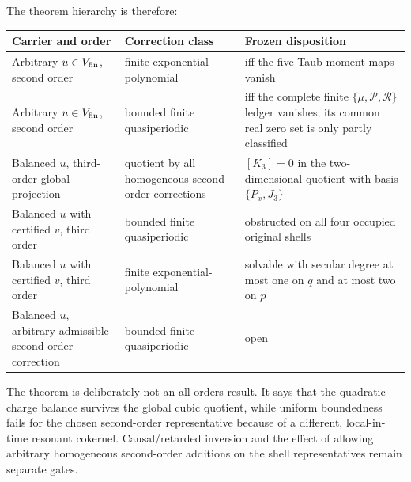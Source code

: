 \documentclass[11pt]{article}
\theoremstyle{definition}
\theoremstyle{remark}
\newcommand{\cP}{\mathcal P}
\newcommand{\cR}{\mathcal R}
\begin{document}
The theorem hierarchy is therefore:
\begin{center}
\small
\begin{tabularx}{0.98\textwidth}{@{}Y Y Y@{}}
\toprule
Carrier and order & Correction class & Frozen disposition\\
\midrule
Arbitrary $u\in V_{\rm fin}$, second order & finite
exponential-polynomial & iff the five Taub moment maps vanish\\
Arbitrary $u\in V_{\rm fin}$, second order & bounded finite
quasiperiodic & iff the complete finite $\{\mu,\cP,\cR\}$ ledger
vanishes; its common real zero set is only partly classified\\
Balanced $u$, third-order global projection & quotient by all homogeneous
second-order corrections & $[K_3]=0$ in the two-dimensional quotient with
basis $\{P_x,J_3\}$\\
Balanced $u$ with certified $v$, third order & bounded finite
quasiperiodic & obstructed on all four occupied original shells\\
Balanced $u$ with certified $v$, third order & finite
exponential-polynomial & solvable with secular degree at most one on $q$
and at most two on $p$\\
Balanced $u$, arbitrary admissible second-order correction & bounded finite
quasiperiodic & open\\
\bottomrule
\end{tabularx}
\end{center}

The theorem is deliberately not an all-orders result.  It says that the
quadratic charge balance survives the global cubic quotient, while uniform
boundedness fails for the chosen second-order representative because of a
different, local-in-time resonant cokernel.  Causal/retarded inversion and
the effect of allowing arbitrary homogeneous second-order additions on the
shell representatives remain separate gates.
\end{document}
